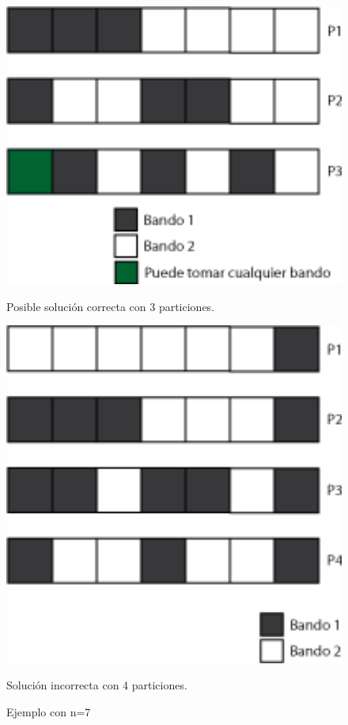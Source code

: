 \begin{figure}[H]
\centering
\begin{minipage}{0.25\textwidth}
  \centering
    \includegraphics[width=1\textwidth]{img/ejemplos/ej1-4.png}
  \caption*{\footnotesize Posible solución correcta con 3 particiones.}
  \label{fig:ej1-4}
\end{minipage}%
\hspace{0.1\textwidth}
\begin{minipage}{0.25\textwidth}   
  \centering
    \includegraphics[width=1\textwidth]{img/ejemplos/ej1-5.png} 
  \caption*{\footnotesize Solución incorrecta con 4 particiones.}
  \label{fig:ej1-5}
\end{minipage}%
\caption{Ejemplo con n=7}
\label{fign7}
\end{figure}

